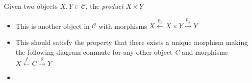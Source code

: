 
Given two objects $X,Y \in \mathcal{C}$, the \emph{product} $X \times Y$

\begin{itemize}
    \item This is another object in $\mathcal{C}$ with morphisms $X \xleftarrow{p_x}X\times Y\xrightarrow{p_y}Y$
    \item This should satisfy the property that there exists a unique morphism making the following diagram commute for any other object \emph{C} and morphisms $X \xleftarrow{f}C\xrightarrow{g}Y$
    \item {}
  \end{itemize}

